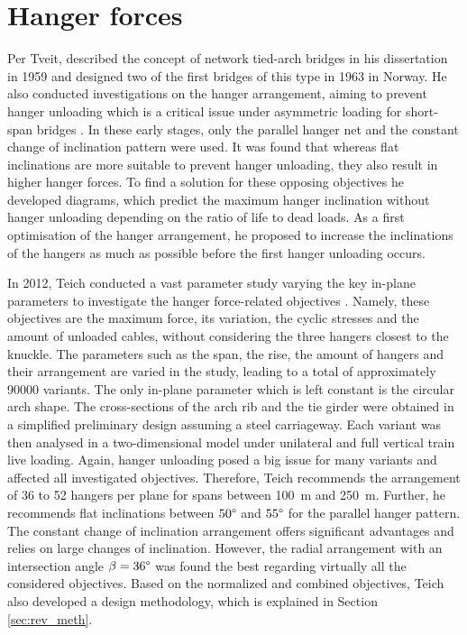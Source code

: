 \section{Hanger forces} \label{sec:rev_forces}
Per Tveit, described the concept of network tied-arch bridges in his dissertation in 1959 and designed two of the first bridges of this type in 1963 in Norway.
He also conducted investigations on the hanger arrangement, aiming to prevent hanger unloading which is a critical issue under asymmetric loading for short-span bridges \cite{Tveit3}.
In these early stages, only the parallel hanger net and the constant change of inclination pattern were used. 
It was found that whereas flat inclinations are more suitable to prevent hanger unloading, they also result in higher hanger forces. To find a solution for these opposing objectives he developed diagrams, which predict the maximum hanger inclination without hanger unloading depending on the ratio of life to dead loads. As a first optimisation of the hanger arrangement, he proposed to increase the inclinations of the hangers as much as possible before the first hanger unloading occurs. \medskip

In 2012, Teich conducted a vast parameter study varying the key in-plane parameters to investigate the hanger force-related objectives \cite{Teich}. Namely, these objectives are the maximum force, its variation, the cyclic stresses and the amount of unloaded cables, without considering the three hangers closest to the knuckle. The parameters such as the span, the rise, the amount of hangers and their arrangement are varied in the study, leading to a total of approximately \SI{90000}{} variants. The only in-plane parameter which is left constant is the circular arch shape. The cross-sections of the arch rib and the tie girder were obtained in a simplified preliminary design assuming a steel carriageway. Each variant was then analysed in a two-dimensional model under unilateral and full vertical train live loading. 
Again, hanger unloading posed a big issue for many variants and affected all investigated objectives. Therefore, Teich recommends the arrangement of 36 to 52 hangers per plane for spans between \SI{100}{m} and \SI{250}{m}. Further, he recommends flat inclinations between $50\degree$ and $55\degree$ for the parallel hanger pattern. The constant change of inclination arrangement offers significant advantages and relies on large changes of inclination. However, the radial arrangement with an intersection angle $\beta=36\degree$ was found the best regarding virtually all the considered objectives. Based on the normalized and combined objectives, Teich also developed a design methodology, which is explained in Section \ref{sec:rev_meth}. \medskip

